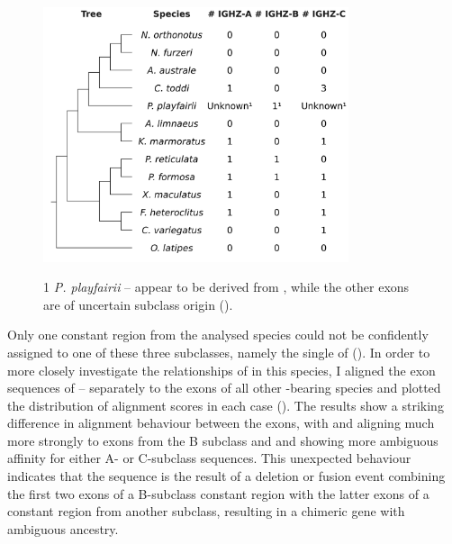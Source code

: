 \begin{figure}
\centering
\includegraphics[width=0.8\textwidth]{_Figures/png/multispecies-cz-subclasses}
\begin{minipage}{0.7\textwidth}
\footnotesize
\begin{threeparttable}
\begin{tablenotes}
\item[1] \textit{P. playfairii}  -- appear to be derived from , while the other exons are of uncertain subclass origin ().
\end{tablenotes}
\end{threeparttable}
\end{minipage}
\label{fig:multispecies-cz-subclasses}
\end{figure}


Only one  constant region from the analysed species could not be confidently assigned to one of these three subclasses, namely the single  of  (). In order to more closely investigate the relationships of  in this species, I aligned the exon sequences of  -- separately to the \cz{} exons of all other -bearing species and plotted the distribution of alignment scores in each case (). The results show a striking difference in alignment behaviour between the exons, with  and  aligning much more strongly to exons from the B subclass and  and  showing more ambiguous affinity for either A- or C-subclass sequences. This unexpected behaviour indicates that the   sequence is the result of a deletion or fusion event combining the first two exons of a B-subclass  constant region with the latter exons of a constant region from another subclass, resulting in a chimeric gene with ambiguous ancestry.

